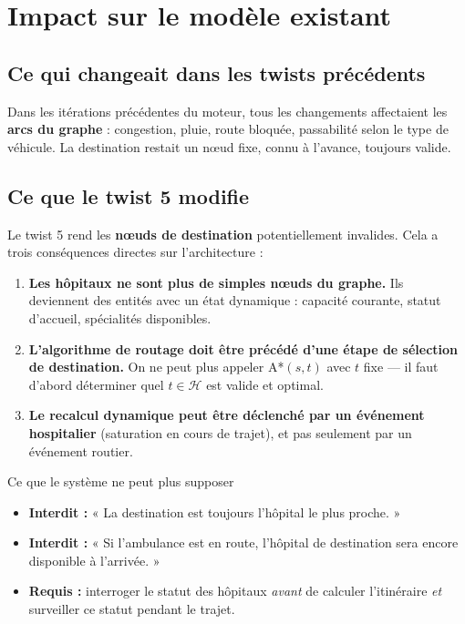 \documentclass[12pt,a4paper]{article}
\theoremstyle{definition}
\theoremstyle{remark}
\begin{document}
\newpage

\section{Impact sur le modèle existant}

\subsection{Ce qui changeait dans les twists précédents}

Dans les itérations précédentes du moteur, tous les changements affectaient
les \textbf{arcs du graphe} : congestion, pluie, route bloquée, passabilité
selon le type de véhicule. La destination restait un nœud fixe, connu
à l'avance, toujours valide.

\subsection{Ce que le twist 5 modifie}

Le twist 5 rend les \textbf{nœuds de destination} potentiellement invalides.
Cela a trois conséquences directes sur l'architecture :

\begin{enumerate}[leftmargin=2em, itemsep=6pt]
  \item \textbf{Les hôpitaux ne sont plus de simples nœuds du graphe.}
    Ils deviennent des entités avec un état dynamique : capacité courante,
    statut d'accueil, spécialités disponibles.

  \item \textbf{L'algorithme de routage doit être précédé d'une étape de
    sélection de destination.} On ne peut plus appeler A*$(s, t)$ avec
    $t$ fixe — il faut d'abord déterminer quel $t \in \mathcal{H}$ est
    valide et optimal.

  \item \textbf{Le recalcul dynamique peut être déclenché par un événement
    hospitalier} (saturation en cours de trajet), et pas seulement par
    un événement routier.
\end{enumerate}

\begin{alertbox}{Ce que le système ne peut plus supposer}
\begin{itemize}[leftmargin=1.5em]
  \item \textbf{Interdit :} « La destination est toujours l'hôpital le
    plus proche. »
  \item \textbf{Interdit :} « Si l'ambulance est en route, l'hôpital de
    destination sera encore disponible à l'arrivée. »
  \item \textbf{Requis :} interroger le statut des hôpitaux \emph{avant}
    de calculer l'itinéraire \emph{et} surveiller ce statut pendant le trajet.
\end{itemize}
\end{alertbox}
\end{document}

